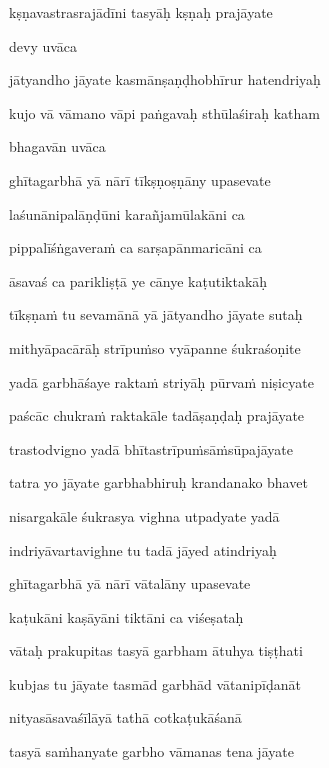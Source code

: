 kṣṇavastrasrajādīni tasyāḥ kṣṇaḥ prajāyate \veg\dontdisplaylinenum

devy uvāca~{\dandab}\dontdisplaylinenum 

jātyandho jāyate kasmānṣaṇḍhobhīrur hatendriyaḥ\thinspace{\danda} \dontdisplaylinenum

kujo vā vāmano vāpi paṅgavaḥ sthūlaśiraḥ katham \veg\dontdisplaylinenum

bhagavān uvāca~{\dandab}\dontdisplaylinenum 

ghītagarbhā yā nārī tīkṣṇoṣṇāny upasevate\thinspace{\danda} \dontdisplaylinenum

laśunānipalāṇḍūni karañjamūlakāni ca \veg\dontdisplaylinenum

pippalīśṅgavera\.m ca sarṣapānmaricāni ca\thinspace{\dandab} \dontdisplaylinenum

āsavaś ca parikliṣṭā ye cānye kaṭutiktakāḥ \veg\dontdisplaylinenum

tīkṣṇa\.m tu sevamānā yā jātyandho jāyate sutaḥ\thinspace{\dandab} \dontdisplaylinenum

mithyāpacārāḥ strīpu\.mso vyāpanne śukraśoṇite \danda\dontdisplaylinenum

yadā garbhāśaye rakta\.m striyāḥ pūrva\.m niṣicyate \veg\dontdisplaylinenum

paścāc chukra\.m raktakāle tadāṣaṇḍaḥ prajāyate\thinspace{\dandab} \dontdisplaylinenum

trastodvigno yadā bhītastrīpu\.msā\.msūpajāyate \veg\dontdisplaylinenum

tatra yo jāyate garbhabhiruḥ krandanako bhavet\thinspace{\dandab} \dontdisplaylinenum

nisargakāle śukrasya vighna utpadyate yadā \veg\dontdisplaylinenum

indriyāvartavighne tu tadā jāyed atindriyaḥ\thinspace{\dandab} \dontdisplaylinenum 

ghītagarbhā yā nārī vātalāny upasevate \veg\dontdisplaylinenum

kaṭukāni kaṣāyāni tiktāni ca viśeṣataḥ\thinspace{\dandab} \dontdisplaylinenum

vātaḥ prakupitas tasyā garbham ātuhya tiṣṭhati \veg\dontdisplaylinenum

kubjas tu jāyate tasmād garbhād vātanipīḍanāt\thinspace{\dandab} \dontdisplaylinenum

nityasāsavaśīlāyā tathā cotkaṭukāśanā \veg\dontdisplaylinenum

tasyā sa\.mhanyate garbho vāmanas tena jāyate\thinspace{\dandab} \dontdisplaylinenum

